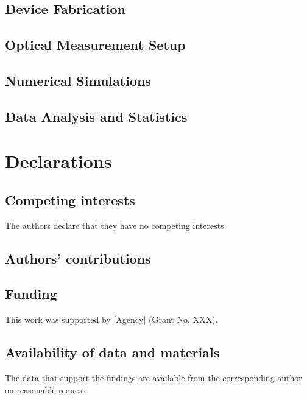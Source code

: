 \documentclass[lineno]{sn-jnl}
\begin{document}
\subsection{Device Fabrication}

\subsection{Optical Measurement Setup}

\subsection{Numerical Simulations}

\subsection{Data Analysis and Statistics}

\section*{Declarations}

\subsection*{Competing interests}
The authors declare that they have no competing interests.

\subsection*{Authors' contributions}

\subsection*{Funding}
This work was supported by [Agency] (Grant No. XXX).

\subsection*{Availability of data and materials}
The data that support the findings are available from the corresponding author on reasonable request.



\end{document}
